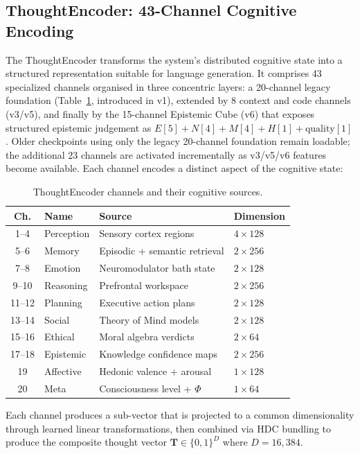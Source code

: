 \documentclass[12pt,a4paper]{article}
\begin{document}
\subsection{ThoughtEncoder: 43-Channel Cognitive Encoding}

The ThoughtEncoder transforms the system's distributed cognitive state into a structured representation suitable for language generation. It comprises 43 specialized channels organised in three concentric layers: a 20-channel legacy foundation (Table~\ref{tab:channels}, introduced in v1), extended by 8 context and code channels (v3/v5), and finally by the 15-channel Epistemic Cube (v6) that exposes structured epistemic judgement as $E[5] + N[4] + M[4] + H[1] + \text{quality}[1]$. Older checkpoints using only the legacy 20-channel foundation remain loadable; the additional 23 channels are activated incrementally as v3/v5/v6 features become available. Each channel encodes a distinct aspect of the cognitive state:

\begin{table}[H]
\centering
\caption{ThoughtEncoder channels and their cognitive sources.}
\label{tab:channels}
\begin{tabular}{clll}
\toprule
\textbf{Ch.} & \textbf{Name} & \textbf{Source} & \textbf{Dimension} \\
\midrule
1--4 & Perception & Sensory cortex regions & $4 \times 128$ \\
5--6 & Memory & Episodic + semantic retrieval & $2 \times 256$ \\
7--8 & Emotion & Neuromodulator bath state & $2 \times 128$ \\
9--10 & Reasoning & Prefrontal workspace & $2 \times 256$ \\
11--12 & Planning & Executive action plans & $2 \times 128$ \\
13--14 & Social & Theory of Mind models & $2 \times 128$ \\
15--16 & Ethical & Moral algebra verdicts & $2 \times 64$ \\
17--18 & Epistemic & Knowledge confidence maps & $2 \times 256$ \\
19 & Affective & Hedonic valence + arousal & $1 \times 128$ \\
20 & Meta & Consciousness level + $\Phi$ & $1 \times 64$ \\
\bottomrule
\end{tabular}
\end{table}

Each channel produces a sub-vector that is projected to a common dimensionality through learned linear transformations, then combined via HDC bundling to produce the composite thought vector $\mathbf{T} \in \{0,1\}^{D}$ where $D = 16{,}384$.
\end{document}
